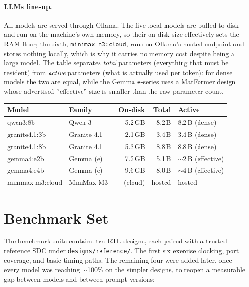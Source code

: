 \documentclass[11pt]{article}
\begin{document}
\paragraph{LLMs line-up.} All models are served through Ollama. The five local models are pulled to disk and run on the machine's own memory, so their on-disk size effectively sets the RAM floor; the sixth, \texttt{minimax-m3:cloud}, runs on Ollama's hosted endpoint and stores nothing locally, which is why it carries no memory cost despite being a large model. The table separates \emph{total} parameters (everything that must be resident) from \emph{active} parameters (what is actually used per token): for dense models the two are equal, while the Gemma \texttt{e}-series uses a MatFormer design whose advertised ``effective'' size is smaller than the raw parameter count.

\begin{table}[h]
\centering
\small
\begin{tabular}{llrrl}
\toprule
\textbf{Model} & \textbf{Family} & \textbf{On-disk} & \textbf{Total} & \textbf{Active} \\
\midrule
qwen3:8b         & Qwen 3      & 5.2\,GB & 8.2\,B & 8.2\,B (dense) \\
granite4.1:3b    & Granite 4.1 & 2.1\,GB & 3.4\,B & 3.4\,B (dense) \\
granite4.1:8b    & Granite 4.1 & 5.3\,GB & 8.8\,B & 8.8\,B (dense) \\
gemma4:e2b       & Gemma (e)   & 7.2\,GB & 5.1\,B & $\sim$2\,B (effective) \\
gemma4:e4b       & Gemma (e)   & 9.6\,GB & 8.0\,B & $\sim$4\,B (effective) \\
minimax-m3:cloud & MiniMax M3  & --- (cloud) & hosted & hosted \\
\bottomrule
\end{tabular}
\end{table}

\section*{Benchmark Set}
The benchmark suite contains ten RTL designs, each paired with a trusted reference SDC under \texttt{designs/reference/}. The first six exercise clocking, port coverage, and basic timing paths. The remaining four were added later, once every model was reaching $\sim$100\% on the simpler designs, to reopen a measurable gap between models and between prompt versions:
\end{document}
